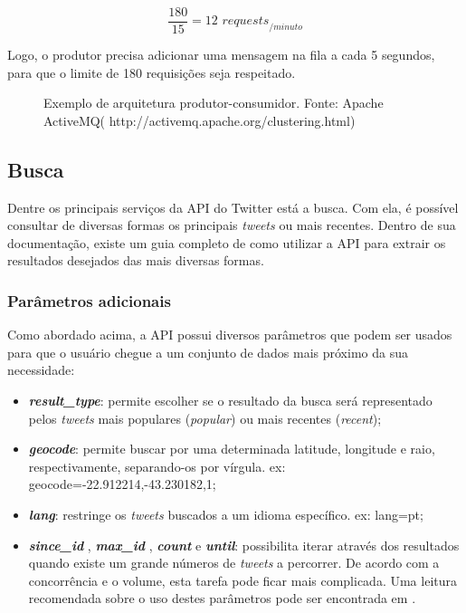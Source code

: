 $$ \frac{180}{15} = 12 \textit{ requests}_{/minuto} $$

Logo, o produtor precisa adicionar uma mensagem na fila a cada 5 segundos, para que o limite de 180 requisições seja respeitado.

\begin{figure}[H]
	\centering\epsfig{file=figuras/[competing-consumers-eps-converted-to_importada_.eps, width=15cm}
	\caption{Exemplo de arquitetura produtor-consumidor. Fonte: Apache ActiveMQ( http://activemq.apache.org/clustering.html)}
	\label{time}
\end{figure}


\subsection{Busca}
Dentre os principais serviços da API do Twitter está a busca. Com ela, é possível consultar de diversas formas os principais \textit{tweets} ou mais recentes. Dentro de sua documentação, existe um guia completo de como utilizar a API  para extrair os resultados desejados \cite{twittersearchapi} das mais diversas formas. 

\subsubsection{Parâmetros adicionais}

Como abordado acima, a API possui diversos parâmetros que podem ser usados para que o usuário chegue a um conjunto de dados mais próximo da sua necessidade:

\begin{itemize}
	\item \textit{\textbf{result\_type}}: permite escolher se o resultado da busca será representado pelos \textit{tweets} mais populares (\textit{popular}) ou mais recentes (\textit{recent});
	\item \textit{\textbf{geocode}}: permite buscar por uma determinada latitude, longitude e raio, respectivamente, separando-os por vírgula. ex: geocode=-22.912214,-43.230182,1;
	\item \textit{\textbf{lang}}: restringe os \textit{tweets} buscados a um idioma específico. ex: lang=pt;
	\item \textit{\textbf{since\_id }},  \textit{\textbf{max\_id }}, \textit{\textbf{count}} e \textit{\textbf{until}}: possibilita iterar através dos resultados quando existe um grande números de \textit{tweets} a percorrer. De acordo com a concorrência e o volume, esta tarefa pode ficar mais complicada. Uma leitura recomendada sobre o uso destes parâmetros pode ser encontrada em \cite{workingwithtimelimes}.
\end{itemize}

